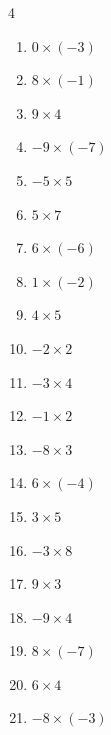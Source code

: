 \begin{multicols}{4}
\begin{enumerate}
  \item $0\times (-3)$
        \phantom{$=0$}

  \item $8\times (-1)$
        \phantom{$=-8$}

  \item $9\times 4$
        \phantom{$=36$}

  \item $-9\times (-7)$
        \phantom{$=63$}

  \item $-5\times 5$
        \phantom{$=-25$}

  \item $5\times 7$
        \phantom{$=35$}

  \item $6\times (-6)$
        \phantom{$=-36$}

  \item $1\times (-2)$
        \phantom{$=-2$}

  \item $4\times 5$
        \phantom{$=20$}

  \item $-2\times 2$
        \phantom{$=-4$}

  \item $-3\times 4$
        \phantom{$=-12$}

  \item $-1\times 2$
        \phantom{$=-2$}

  \item $-8\times 3$
        \phantom{$=-24$}

  \item $6\times (-4)$
        \phantom{$=-24$}

  \item $3\times 5$
        \phantom{$=15$}

  \item $-3\times 8$
        \phantom{$=-24$}

  \item $9\times 3$
        \phantom{$=27$}

  \item $-9\times 4$
        \phantom{$=-36$}

  \item $8\times (-7)$
        \phantom{$=-56$}

  \item $6\times 4$
        \phantom{$=24$}

\columnbreak %

  \item $-8\times (-3)$
        \phantom{$=24$}


\end{enumerate}
\end{multicols}
